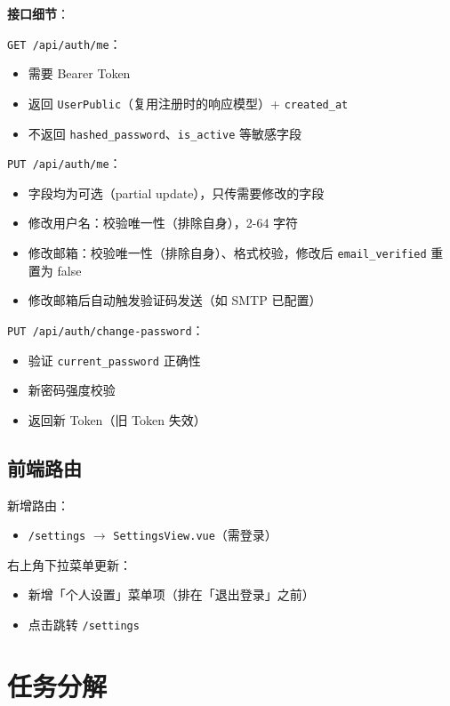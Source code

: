 \documentclass[11pt,a4paper]{article}
\begin{document}
\textbf{接口细节}：

\texttt{GET /api/auth/me}：
\begin{itemize}[nosep]
  \item 需要 Bearer Token
  \item 返回 \texttt{UserPublic}（复用注册时的响应模型）+ \texttt{created\_at}
  \item 不返回 \texttt{hashed\_password}、\texttt{is\_active} 等敏感字段
\end{itemize}

\texttt{PUT /api/auth/me}：
\begin{itemize}[nosep]
  \item 字段均为可选（partial update），只传需要修改的字段
  \item 修改用户名：校验唯一性（排除自身），2-64 字符
  \item 修改邮箱：校验唯一性（排除自身）、格式校验，修改后 \texttt{email\_verified} 重置为 false
  \item 修改邮箱后自动触发验证码发送（如 SMTP 已配置）
\end{itemize}

\texttt{PUT /api/auth/change-password}：
\begin{itemize}[nosep]
  \item 验证 \texttt{current\_password} 正确性
  \item 新密码强度校验
  \item 返回新 Token（旧 Token 失效）
\end{itemize}

\subsection{前端路由}

新增路由：
\begin{itemize}[nosep]
  \item \texttt{/settings} $\to$ \texttt{SettingsView.vue}（需登录）
\end{itemize}

右上角下拉菜单更新：
\begin{itemize}[nosep]
  \item 新增「个人设置」菜单项（排在「退出登录」之前）
  \item 点击跳转 \texttt{/settings}
\end{itemize}

\section{任务分解}
\end{document}
